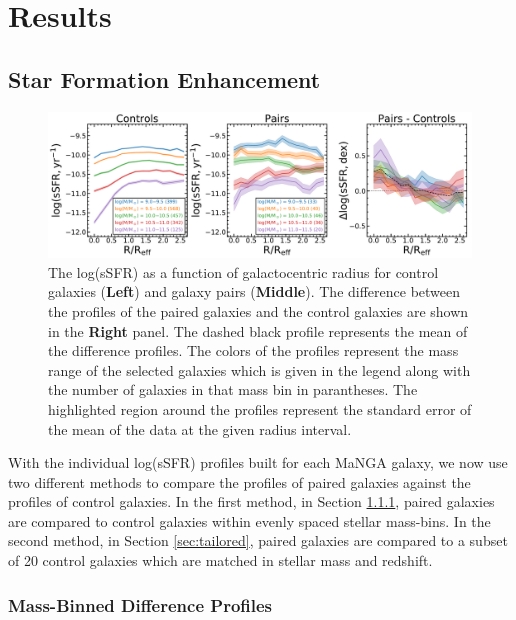 \documentclass[iop,revtex4,twocolumn,apj,numberedappendix,appendixfloats]{emulateapj}
\begin{document}
\section{Results}\label{sec:results}

\subsection{Star Formation Enhancement}

\begin{figure}
\centering
\includegraphics[width=\linewidth]{fig/ssfr_comb.pdf}
\caption[]{The log(sSFR) as a function of galactocentric radius for control galaxies (\textbf{Left}) and galaxy pairs (\textbf{Middle}). The difference between the profiles of the paired galaxies and the control galaxies are shown in the \textbf{Right} panel. The dashed black profile represents the mean of the difference profiles. The colors of the profiles represent the mass range of the selected galaxies which is given in the legend along with the number of galaxies in that mass bin in parantheses. The highlighted region around the profiles represent the standard error of the mean of the data at the given radius interval. }
\label{fig:ssfr_prof}
\end{figure}

With the individual log(sSFR) profiles built for each MaNGA galaxy, we now use two different methods to compare the profiles of paired galaxies against the profiles of control galaxies. In the first method, in Section \ref{sec:mass-bin}, paired galaxies are compared to control galaxies within evenly spaced stellar mass-bins. In the second method, in Section \ref{sec:tailored}, paired galaxies are compared to a subset of 20 control galaxies which are matched in stellar mass and redshift. 

\subsubsection{Mass-Binned Difference Profiles}\label{sec:mass-bin}
\end{document}
